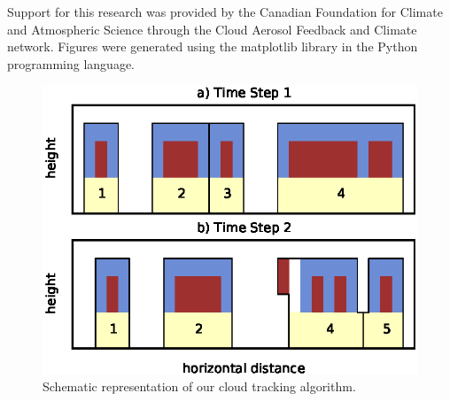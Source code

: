 \documentclass[acp]{copernicus}
\begin{document}
\begin{acknowledgements}
Support for this research was provided by the Canadian Foundation for Climate 
and Atmospheric Science through the Cloud Aerosol Feedback and Climate 
network.  Figures were generated using the matplotlib library in the Python
programming language.
\end{acknowledgements}


















\begin{figure}[t]
\vspace*{2mm}
\begin{center}
\includegraphics[width=\textwidth]{./figures/cloudfinder_instructions}
\end{center}
\caption{Schematic representation of our cloud tracking algorithm.}
\label{fig:cloudfinder_instructions}
\end{figure}
\end{document}
